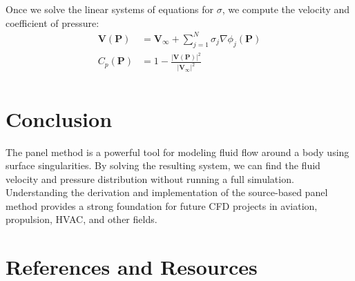 \documentclass[conf]{new-aiaa} %
\begin{document}
Once we solve the linear systems of equations for $\sigma$, we compute the velocity and coefficient of pressure:
\begin{align}
\mathbf{V}(\mathbf{P}) &= \mathbf{V}_\infty + \sum_{j=1}^{N} \sigma_j \nabla \phi_j (\mathbf{P}) \\
C_p(\mathbf{P}) &= 1 - \frac{\lvert \mathbf{V}(\mathbf{P}) \rvert^2}{\lvert \mathbf{V}_\infty \rvert^2} \\
\label{eq:vel_cp}
\end{align}

\section{Conclusion}
The panel method is a powerful tool for modeling fluid flow around a body using surface singularities. 
By solving the resulting system, we can find the fluid velocity and pressure distribution without running a full simulation. 
Understanding the derivation and implementation of the source-based panel method provides a strong foundation for future CFD projects in aviation, propulsion, HVAC, and other fields.

\section{References and Resources}

\nocite{*}


\end{document}
